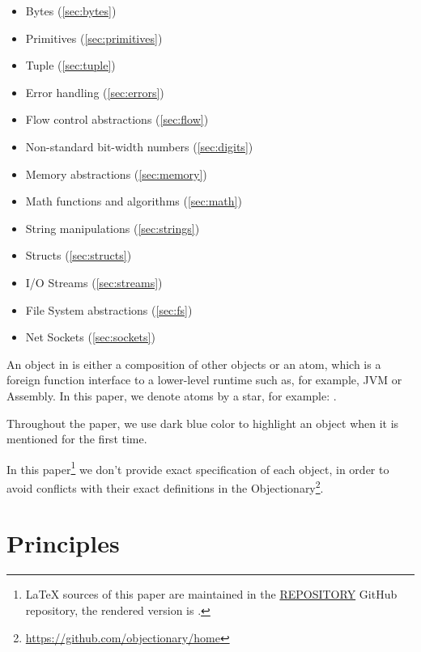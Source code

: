 \documentclass[sigplan,nonacm]{acmart}
\newcommand\aff[1]{\ff{\textcolor{gray}{\(\star\)}#1}}
\begin{document}
\begin{itemize}
    \item Bytes (\cref{sec:bytes})
    \item Primitives (\cref{sec:primitives})
    \item Tuple (\cref{sec:tuple})
    \item Error handling (\cref{sec:errors})
    \item Flow control abstractions (\cref{sec:flow})
    \item Non-standard bit-width numbers (\cref{sec:digits})
    \item Memory abstractions (\cref{sec:memory})
    \item Math functions and algorithms (\cref{sec:math})
    \item String manipulations (\cref{sec:strings})
    \item Structs (\cref{sec:structs})
    \item I/O Streams (\cref{sec:streams})
    \item File System abstractions (\cref{sec:fs})
    \item Net Sockets (\cref{sec:sockets})
\end{itemize}

An object in \eolang{} is either a composition of other objects or an atom, which is a foreign function interface to a lower-level runtime such as, for example, JVM or Assembly.
In this paper, we denote atoms by a star, for example: \aff{times}.

Throughout the paper, we use dark blue color to highlight an object when it is mentioned for the first time.

In this paper\footnote{\raggedright%
\LaTeX{} sources of this paper are maintained in the
\href{https://github.com/REPOSITORY}{REPOSITORY} GitHub repository,
the rendered version is \href{https://github.com/REPOSITORY/releases/tag/0.0.0}{}.}
we don't provide exact specification of each object, in order to avoid conflicts with their exact definitions in the Objectionary\footnote{\url{https://github.com/objectionary/home}}.

\section{Principles}
\end{document}
